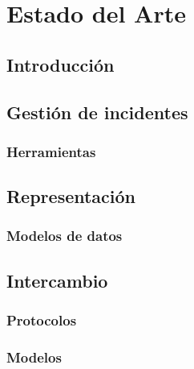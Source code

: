 \chapter{Estado del Arte}
\label{capitulo2}

\section{Introducción}
\label{introduccion}


\section{Gestión de incidentes}
\label{gestiondeincidentes}
\subsection{Herramientas}
\label{herramientas}


\section{Representación}
\label{representacion}
\subsection{Modelos de datos}
\label{modelodedatos}



%


\section{Intercambio}
\label{intercambio}
\subsection{Protocolos}
\label{protocolos}
 
 
\subsection{Modelos}
\label{modelos}
 
